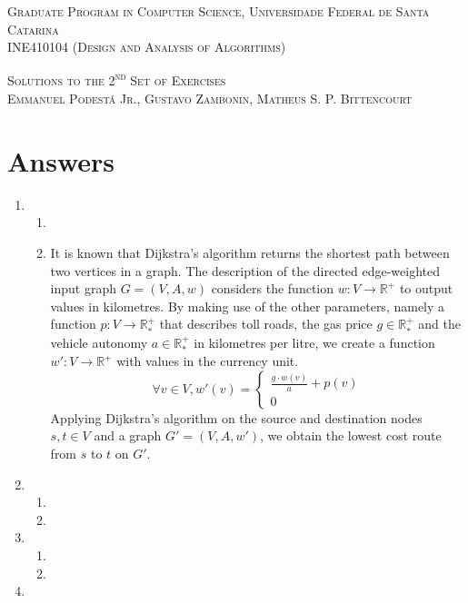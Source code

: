 \documentclass[12pt]{article}
\begin{document}
\textsc{Graduate Program in Computer Science,
  Universidade Federal de Santa Catarina} \\
\textsc{INE410104 (Design and Analysis of Algorithms)}

\textsc{Solutions to the 2\textsuperscript{nd} Set of Exercises} \\
\textsc{Emmanuel Podestá Jr., Gustavo Zambonin, Matheus S. P. Bittencourt}

\section{Answers}

\begin{enumerate}
  \item
  \begin{enumerate}
    \item 
    \item It is known that Dijkstra's algorithm returns the shortest path between two vertices in a graph. The description of the directed edge-weighted input graph $G = (V, A, w)$ considers the function $w : V \to \mathbb{R}^{+}$ to output values in kilometres. By making use of the other parameters, namely a function $p : V \to \mathbb{R}_{*}^{+}$ that describes toll roads, the gas price $g \in \mathbb{R}_{*}^{+}$ and the vehicle autonomy $a \in \mathbb{R}_{*}^{+}$ in kilometres per litre, we create a function $w' : V \to \mathbb{R}^{+}$ with values in the currency unit.
    $$\forall v \in V, w'(v) = 
    \begin{cases}
        \frac{g \cdot w(v)}{a} + p(v) \\
        0
    \end{cases}
    $$
    Applying Dijkstra's algorithm on the source and destination nodes $s, t \in V$ and a graph $G' = (V, A, w')$, we obtain the lowest cost route from $s$ to $t$ on $G'$.
  \end{enumerate}
  \item
  \begin{enumerate}
    \item 
    \item 
  \end{enumerate}
  \item
  \begin{enumerate}
    \item 
    \item 
  \end{enumerate}
  \item 
  \begin{enumerate}

\end{enumerate}
\end{enumerate}
\end{document}
